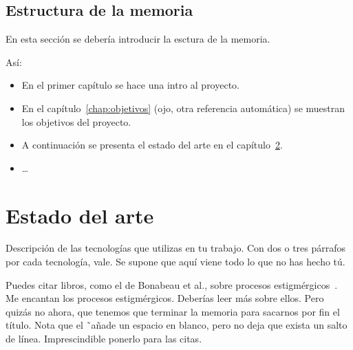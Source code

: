 \documentclass[a4paper, 12pt]{book}
\begin{document}
\section{Estructura de la memoria}
\label{sec:estructura}

En esta sección se debería introducir la esctura de la memoria. 

Así:

\begin{itemize}
  \item En el primer capítulo se hace una intro al proyecto.
  
  \item En el capítulo~\ref{chap:objetivos} (ojo, otra referencia automática) se muestran los objetivos del proyecto.
  
  \item A continuación se presenta el estado del arte en el capítulo~\ref{chap:estado}.
  
  \item \ldots
\end{itemize}





\cleardoublepage
\chapter{Estado del arte}
\label{chap:estado}

Descripción de las tecnologías que utilizas en tu trabajo. 
Con dos o tres párrafos por cada tecnología, vale. 
Se supone que aquí viene todo lo que no has hecho tú.

Puedes citar libros, como el de Bonabeau et al., sobre procesos estigmérgicos~\cite{bonabeau:_swarm}. 
Me encantan los procesos estigmérgicos.
Deberías leer más sobre ellos.
Pero quizás no ahora, que tenemos que terminar la memoria para sacarnos por fin el título.
Nota que el \~ \ añade un espacio en blanco, pero no deja que exista un salto de línea. 
Imprescindible ponerlo para las citas.
\end{document}
